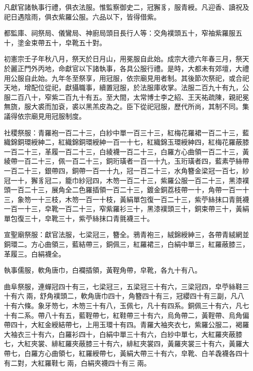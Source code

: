 \begin{pinyinscope}
 凡獻官諸執事行禮，俱衣法服。惟監察御史二，冠獬豸，服青綬。凡迎香、讀祝及祀日遇陰雨，俱衣紫羅公服。六品以下，皆得借紫。



 都監庫、祠祭局、儀鸞局、神廚局頭目長行人等：交角襆頭五十，窄袖紫羅服五十，塗金束帶五十，皁靴五十對。



 初憲宗壬子年秋八月，祭天於日月山，用冕服自此始。成宗大德六年春三月，祭天於麗正門外丙地，命獻官以下諸執事，各具公服行禮。是時，大都未有郊壇，大禮用公服自此始。九年冬至祭享，用冠服，依宗廟見用者制。其後節次祭祀，或合祀天地，增配位從祀，獻攝職事，續置冠服，於法服庫收掌。法服二百九十有九，公服二百八十，窄紫二百九十有五。至大間，太常博士李之紹、王天祐疏陳，親祀冕無旒，服大裘而加袞，裘以黑羔皮為之。臣下從祀冠服，歷代所尚，其制不同。集議得依宗廟見用冠服制度。



 社稷祭服：青羅袍一百二十三，白紗中單一百三十三，紅梅花羅裙一百二十三，藍織錦銅環綬紳二，紅織錦銅環綬紳一百一十七，紅織錦玉環綬紳四，紅梅花羅蔽膝一百二十三，革履一百二十三，白綾襪一百二十三，白羅方心曲領一百二十三，黃綾帶一百二十三，佩一百二十三，銅珩璜者一百一十九，玉珩璜者四，藍素苧絲帶一百二十三，銀帶四，銅帶一百一十九，冠一百二十三，水角簪金梁冠一百七，紗冠一十，獬豸冠二，籠巾紗冠四，木笏一百二十三，紫羅公服一百二十三，黑漆襆頭一百二十三，展角全二色羅插領一百二十三，鍍金銅荔枝帶一十，角帶一百一十三，象笏一十三枝，木笏一百一十枝，黃絹單包復一百二十三，紫苧絲抹口青氈襪一百一十三，皁靴一百二十三，窄紫羅衫三十，黑漆襆頭三十，銅束帶三十，黃絹單包復三十，皁靴三十，紫苧絲抹口青氈襪三十。



 宣聖廟祭服：獻官法服，七梁冠三，簪全。鴉青袍三，絨錦綬紳三，各帶青絨網並銅環二。方心曲領三，藍結帶三，銅佩三，紅羅裙三，白絹中單三，紅羅蔽膝三，革履三。白絹襪全。



 執事儒服，軟角唐巾，白襴插領，黃鞓角帶，皁靴，各九十有八。



 曲阜祭服，連蟬冠四十有三，七梁冠三，五梁冠三十有六，三梁冠四，皁苧絲鞋三十有六兩，舒角襆頭二，軟角唐巾四十，角簪四十有三，冠纓四十有三副，凡八十有六條。象牙笏七，木笏三十有八，玉佩七，凡十有四系。銅佩三十有六，凡七十有二系。帶八十有五，藍鞓帶七，紅鞋帶三十有六，烏角帶二，黃鞓帶、烏角偏帶四十，大紅金綬結帶七，上用玉環十有四。青羅大袖夾衣七，紫羅公服二，褐羅大袖衣三十有六，白羅衫四十，白絹中單三十有六，白紗中單七，大紅羅夾蔽膝七，大紅夾裳、緋紅羅夾蔽膝三十有六，緋紅夾裳四，黃羅夾裳三十有六，黃羅大帶七，白羅方心曲領七，紅羅綬帶七，黃絹大帶三十有六，皁靴、白羊毳襪各四十有二對，大紅羅鞋七兩，白絹夾襪四十有三兩。




\end{pinyinscope}
